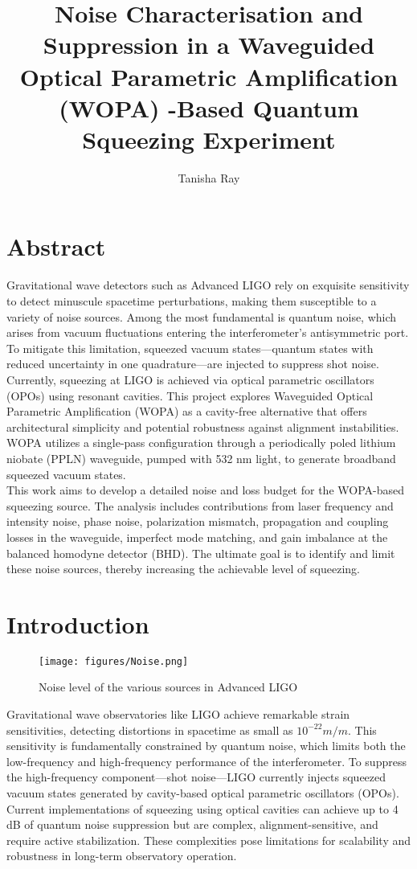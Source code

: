 \documentclass[colorlinks=true,pdfstartview=FitV,linkcolor=blue,
citecolor=red,urlcolor=magenta]{ligodoc}
\title{\large{ Noise Characterisation and Suppression in a Waveguided Optical Parametric Amplification (WOPA) -Based Quantum Squeezing Experiment}}
\author{Tanisha Ray}
\begin{document}
\tableofcontents


\newpage

\section{Abstract}
Gravitational wave detectors such as Advanced LIGO rely on exquisite sensitivity to detect minuscule spacetime perturbations, making them susceptible to a variety of noise sources. Among the most fundamental is quantum noise, which arises from vacuum fluctuations entering the interferometer’s antisymmetric port. To mitigate this limitation, squeezed vacuum states—quantum states with reduced uncertainty in one quadrature—are injected to suppress shot noise. Currently, squeezing at LIGO is achieved via optical parametric oscillators (OPOs) using resonant cavities. This project explores Waveguided Optical Parametric Amplification (WOPA) as a cavity-free alternative that offers architectural simplicity and potential robustness against alignment instabilities. WOPA utilizes a single-pass configuration through a periodically poled lithium niobate (PPLN) waveguide, pumped with 532 nm light, to generate broadband squeezed vacuum states. \\
This work aims to develop a detailed noise and loss budget for the WOPA-based squeezing source. The analysis includes contributions from laser frequency and intensity noise, phase noise, polarization mismatch, propagation and coupling losses in the waveguide, imperfect mode matching, and gain imbalance at the balanced homodyne detector (BHD). The ultimate goal is to identify and limit these noise sources, thereby increasing the achievable level of squeezing. 
\section{Introduction}
\begin{figure}[H]
    \centering
    \texttt{[image: figures/Noise.png]}
   \caption{Noise level of the various sources in Advanced LIGO \cite{mckenzie}}
    \label{fig:enter-label}
\end{figure}
Gravitational wave observatories like LIGO achieve remarkable strain sensitivities, detecting distortions in spacetime as small as $10^{-22}m/m$. This sensitivity is fundamentally constrained by quantum noise, which limits both the low-frequency and high-frequency performance of the interferometer. To suppress the high-frequency component—shot noise—LIGO currently injects squeezed vacuum states generated by cavity-based optical parametric oscillators (OPOs).
Current implementations of squeezing using optical cavities can achieve up to 4 dB of quantum noise suppression but are complex, alignment-sensitive, and require active stabilization\cite{goda}. These complexities pose limitations for scalability and robustness in long-term observatory operation.
\end{document}

